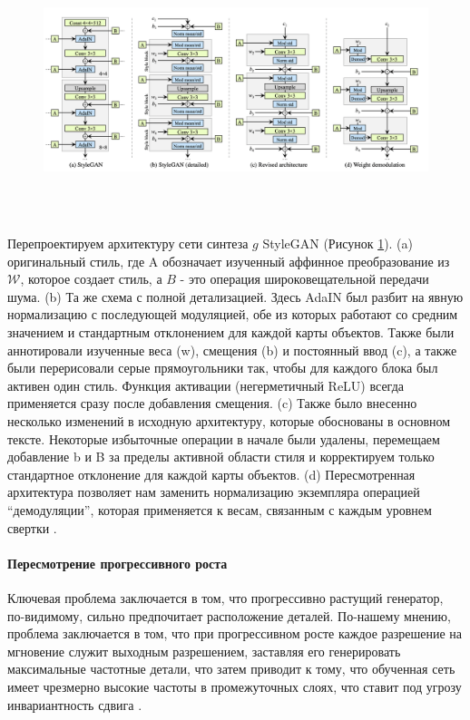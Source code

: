 \begin{figure}
    \centering
    \includegraphics[height=75mm]{fig/stylegan2_scheme.png}
    \caption{}
    \label{fig.stylegan2_scheme}
\end{figure}
Перепроектируем архитектуру сети синтеза $g$ StyleGAN (Рисунок {\color{blue} \ref{fig.stylegan2_scheme}}). (a) оригинальный стиль, где A обозначает изученный
аффинное преобразование из $\mathcal{W}$, которое создает стиль, а $B$ - это операция широковещательной передачи шума. (b) Та же схема с полной детализацией. Здесь AdaIN был разбит на явную нормализацию с последующей модуляцией, обе из которых работают со средним значением и стандартным отклонением для каждой карты объектов. Также были аннотировали изученные веса (w), смещения (b) и постоянный ввод (c), а также были перерисовали серые прямоугольники так, чтобы для каждого блока был активен один стиль. Функция активации (негерметичный ReLU) всегда применяется сразу после добавления смещения. (c) Также было внесенно несколько изменений в исходную архитектуру, которые обоснованы в основном тексте. Некоторые избыточные операции в начале были удалены, перемещаем добавление b и B за пределы активной области стиля и корректируем только стандартное отклонение для каждой карты объектов. (d) Пересмотренная архитектура позволяет нам заменить нормализацию экземпляра операцией “демодуляции”, которая применяется к весам, связанным с каждым уровнем свертки \cite{StyleGAN2}.

\paragraph{Пересмотрение прогрессивного роста}

Ключевая проблема заключается в том, что прогрессивно растущий генератор, по-видимому, сильно предпочитает расположение деталей. По-нашему мнению, проблема заключается в том, что при прогрессивном росте каждое разрешение на мгновение служит выходным разрешением, заставляя его генерировать максимальные частотные детали, что затем приводит к тому, что обученная сеть имеет чрезмерно высокие частоты в промежуточных слоях, что ставит под угрозу инвариантность сдвига \cite{shift_invariant_networks}.

